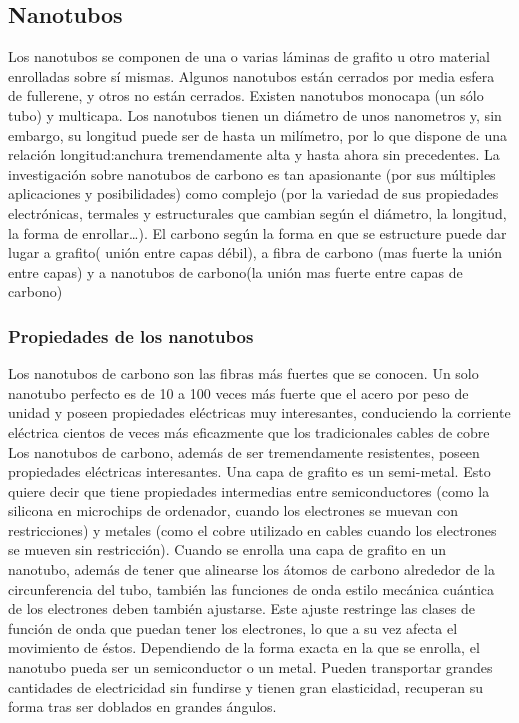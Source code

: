 \documentclass[../main]{subfiles}
\begin{document}
\subsection{Nanotubos}

Los nanotubos se componen de una o varias láminas de grafito u otro
material enrolladas sobre sí mismas. Algunos nanotubos están cerrados
por media esfera de fullerene, y otros no están cerrados. Existen
nanotubos monocapa (un sólo tubo) y multicapa.
Los nanotubos tienen un diámetro de unos nanometros y, sin embargo,
su longitud puede ser de hasta un milímetro, por lo que dispone de
una relación longitud:anchura tremendamente alta y hasta ahora sin precedentes.
La investigación sobre nanotubos de carbono es tan apasionante (por
sus múltiples aplicaciones y posibilidades) como complejo (por la
  variedad de sus propiedades electrónicas, termales y estructurales
que cambian según el diámetro, la longitud, la forma de enrollar…).
El carbono según la forma en que se estructure puede dar lugar a
grafito( unión entre capas débil), a fibra de carbono (mas fuerte la
unión entre capas) y a nanotubos de carbono(la unión mas fuerte entre
capas de carbono)

\subsubsection{Propiedades de los nanotubos}

Los nanotubos de carbono son las fibras más fuertes que se conocen.
Un solo nanotubo perfecto es de 10 a 100 veces más fuerte que el
acero por peso de unidad y poseen propiedades eléctricas muy
interesantes, conduciendo la corriente eléctrica cientos de veces más
eficazmente que los tradicionales cables de cobre
Los nanotubos de carbono, además de ser tremendamente resistentes,
poseen propiedades eléctricas interesantes. Una capa de grafito es un
semi-metal. Esto quiere decir que tiene propiedades intermedias entre
semiconductores (como la silicona en microchips de ordenador, cuando
los electrones se muevan con restricciones) y metales (como el cobre
utilizado en cables cuando los electrones se mueven sin restricción).
Cuando se enrolla una capa de grafito en un nanotubo, además de tener
que alinearse los átomos de carbono alrededor de la circunferencia
del tubo, también las funciones de onda estilo mecánica cuántica de
los electrones deben también ajustarse. Este ajuste restringe las
clases de función de onda que puedan tener los electrones, lo que a
su vez afecta el movimiento de éstos. Dependiendo de la forma exacta
en la que se enrolla, el nanotubo pueda ser un semiconductor o un metal.
Pueden transportar grandes cantidades de electricidad sin fundirse y
tienen gran elasticidad, recuperan su forma tras ser doblados en
grandes ángulos.
\end{document}
